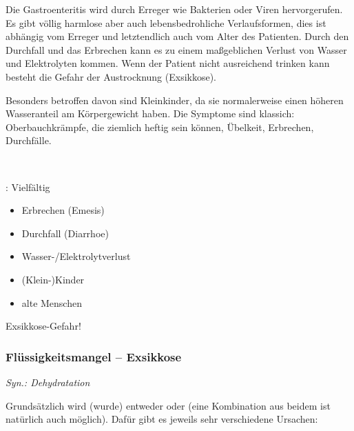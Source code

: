 \gMarried
{Die Gastroenteritis wird durch Erreger
wie Bakterien oder Viren hervorgerufen. Es gibt völlig
harmlose aber auch lebensbedrohliche Verlaufsformen, dies ist abhängig vom Erreger und
letztendlich auch vom Alter des Patienten. Durch den
Durchfall und das Erbrechen kann es zu einem maßgeblichen
Verlust von Wasser und Elektrolyten kommen. Wenn der Patient
nicht ausreichend trinken kann besteht die Gefahr der Austrocknung (Exsikkose).

Besonders betroffen davon sind Kleinkinder, da sie
normalerweise einen höheren Wasseranteil am Körpergewicht
haben.  Die Symptome sind klassich: Oberbauchkrämpfe,
die ziemlich heftig sein können, Übelkeit, Erbrechen, Durchfälle.
}{~

: Vielfältig


\begin{itemize}
\item Erbrechen (Emesis)
\item Durchfall (Diarrhoe)
\item Wasser-/Elektrolytverlust
\end{itemize}


\begin{itemize}
\item (Klein-)Kinder
\item alte Menschen
\end{itemize}

Exsikkose-Gefahr!}






\subsubsection{Flüssigkeitsmangel -- Exsikkose}

\emph{Syn.: Dehydratation}


Grundsätzlich wird (wurde) entweder 
oder  (eine Kombination aus
beidem ist natürlich auch möglich). Dafür gibt es jeweils sehr verschiedene Ursachen: 

